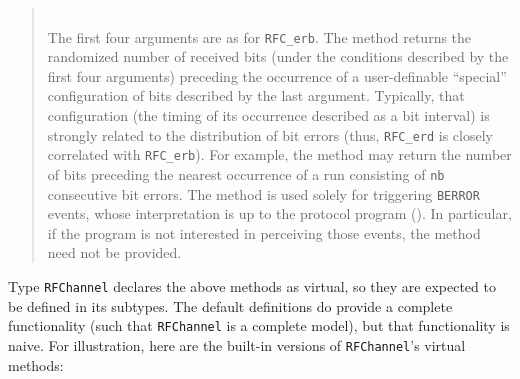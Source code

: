 \begin{quote}
\noindent{} \hspace{0in}\vspace{0.05in}\\
\noindent
The first four arguments are as for {\tt RFC\_erb}.
The method returns the randomized number of received
bits (under the conditions described by the first four arguments)
preceding the occurrence of
a user-definable ``special''
configuration of bits described by the last argument.
Typically, that configuration
(the timing of its occurrence described as a bit interval)
is strongly related to the distribution of
bit errors (thus, {\tt RFC\_erd} is closely correlated with {\tt RFC\_erb}).
For example, the method may
return the number of bits preceding the nearest occurrence of a run consisting
of {\tt nb} consecutive bit errors.
The method is used solely
for triggering {\tt BERROR} events, whose interpretation
is up to the protocol program ().
In particular, if the program is not interested in perceiving those events,
the method need not be provided.
\end{quote}

Type {\tt RFChannel} declares the above methods as virtual, so they are
expected to be defined in its subtypes.
The default definitions do provide a complete functionality (such that
{\tt RFChannel} is a complete model), but that functionality is naive.
For illustration, here are the built-in versions of {\tt RFChannel}'s
virtual methods:

